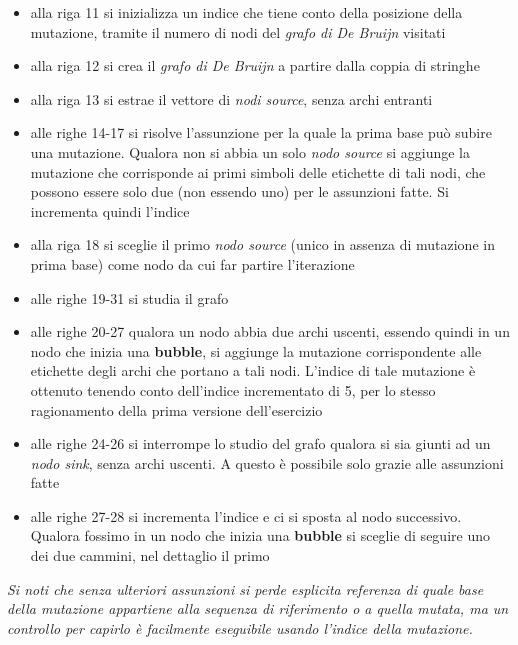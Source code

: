 \documentclass[a4paper,12pt, oneside]{book}
\begin{document}
\begin{itemize}
  \item alla riga 11 si inizializza un indice che tiene conto della posizione
  della mutazione, tramite il numero di nodi del \textit{grafo di De Bruijn}
  visitati 
  \item alla riga 12 si crea il \textit{grafo di De Bruijn} a partire dalla
  coppia di stringhe
  \item alla riga 13 si estrae il vettore di \textit{nodi source}, senza archi
  entranti
  \item alle righe 14-17 si risolve l'assunzione per la quale la prima base può
  subire una mutazione. Qualora non si abbia un solo \textit{nodo source} si
  aggiunge la mutazione che corrisponde ai primi simboli delle etichette di tali
  nodi, che possono essere solo due (non essendo uno) per le assunzioni fatte.
  Si incrementa quindi l'indice 
  \item alla riga 18 si sceglie il primo \textit{nodo source} (unico in assenza
  di mutazione in prima base) come nodo da cui far partire l'iterazione
  \item alle righe 19-31 si studia il grafo
  \item alle righe 20-27 qualora un nodo abbia due archi uscenti, essendo quindi
  in un nodo che inizia una \textbf{bubble}, si aggiunge la
  mutazione corrispondente alle etichette degli archi che portano a tali
  nodi. L'indice di tale mutazione è ottenuto tenendo conto dell'indice
  incrementato di 5, per lo stesso ragionamento della prima versione
  dell'esercizio
  \item alle righe 24-26 si interrompe lo studio del grafo qualora si sia giunti
  ad un \textit{nodo sink}, senza archi uscenti. A questo è possibile solo
  grazie alle assunzioni fatte 
  \item alle righe 27-28 si incrementa l'indice e ci si sposta al nodo
  successivo. Qualora fossimo in un nodo che inizia una \textbf{bubble} si
  sceglie di seguire uno dei due cammini, nel dettaglio il primo
\end{itemize}
\textit{Si noti che senza ulteriori assunzioni si perde esplicita referenza di
quale base della mutazione appartiene alla sequenza di riferimento o a quella
mutata, ma un controllo per capirlo è facilmente eseguibile usando l'indice
della mutazione.}\\
\newpage
\end{document}

